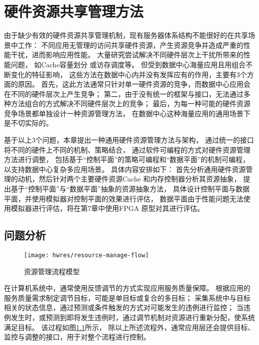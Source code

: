 

\chapter{硬件资源共享管理方法}
\label{chap:hwresman}

由于缺少有效的硬件资源共享管理机制，现有服务器体系结构不能很好的在共享场景中工作：
不同应用无管理的访问共享硬件资源，产生资源竞争并造成严重的性能干扰，进而影响应用性能。
大量研究尝试解决不同硬件层次上干扰所带来的性能问题，
如Cache容量划分\cite{kasture_ubik:_2014, sanchez_vantage:_2011, sanchez_zcache:_2010, qureshi_utility-based_2006}
或访存调度\cite{muralidhara_reducing_2011}等。
但受到数据中心海量应用\cite{Reiss_googletrace_2012}且用组合不断变化的特征影响，
这些方法在数据中心内并没有发挥应有的作用，主要有3个方面的原因。
首先，这此方法通常只针对单一硬件资源的竞争，而数据中心应用会在不同的硬件层次上产生竞争；
第二，由于没有统一的框架与接口，无法通过多种方法组合的方式解决不同硬件层次上的竞争；
最后，为每一种可能的硬件资源竞争场景都单独设计一种资源管理方法，
在数据中心这种海量应用的通用场景下是不切实际的。

基于以上3个问题，本章提出一种通用硬件资源管理方法与架构，
通过统一的接口将不同的硬件上不同的机制、策略结合，
通过软件可编程的方式对硬件资源管理方法进行调整，
包括基于``控制平面''的策略可编程和``数据平面''的机制可编程，以支持数据中心复杂多应用场景。
具体内容安排如下：
首先分析通用硬件资源管理的动机，然后针对两个主要硬件资源Cache 和内存控制器分析其资源抽象，
提出基于``控制平面''与``数据平面''抽象的资源抽象方法，
具体设计控制平面与数据平面，并使用模拟器对控制平面的效果进行评估，
数据平面由于性能问题无法使用模拟器进行评估，将在第7章中使用FPGA 原型对其进行评估。


\section{问题分析}

\begin{figure}[tb]
  \centering
  \texttt{[image: hwres/resource-manage-flow]}
  \caption{资源管理流程模型}
  \label{fig:resource-manage-flow}
\end{figure}

在计算机系统中，通常使用反馈调节的方式实现应用服务质量保障。
根据应用的服务质量需求制定调节目标，可能是单目标或复合的多目标；
采集系统中与目标相关的状态信息，通过预测或条件触发的方式对可能发生的违例进行监控；
当违例发生时，或预测到即将发生违例时，通过调节机制对资源进行重新分配，使系统满足目标。
该过程如图\ref{fig:resource-manage-flow}所示，
除以上所述流程外，通常应用层还会提供目标、监控与调整的接口，用于对整个流程进行控制。

